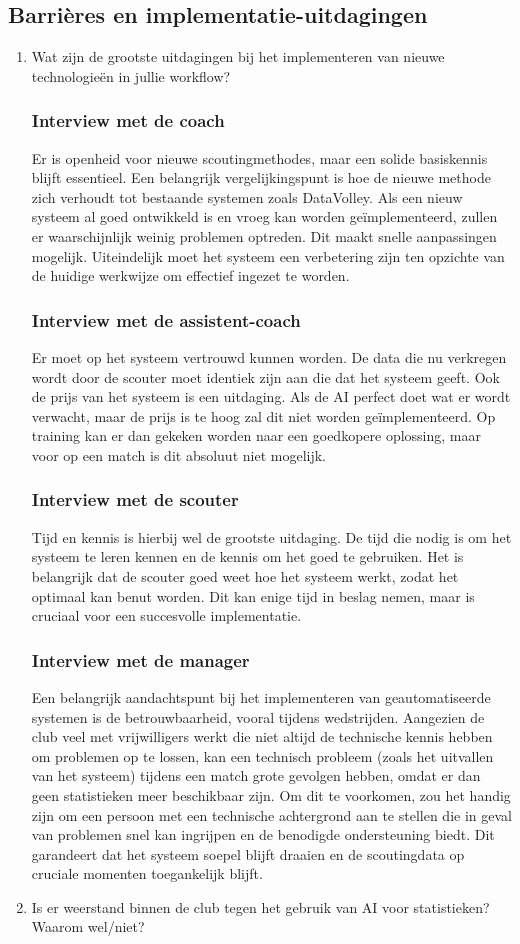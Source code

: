 \subsection{Barrières en implementatie-uitdagingen}
\begin{enumerate}
  \item Wat zijn de grootste uitdagingen bij het implementeren van nieuwe technologieën in jullie workflow?
  \subsubsection{Interview met de coach}
  Er is openheid voor nieuwe scoutingmethodes, maar een solide basiskennis blijft essentieel. Een belangrijk vergelijkingspunt is hoe de nieuwe methode zich verhoudt tot bestaande systemen zoals DataVolley. Als een nieuw systeem al goed ontwikkeld is en vroeg kan worden geïmplementeerd, zullen er waarschijnlijk weinig problemen optreden. Dit maakt snelle aanpassingen mogelijk. Uiteindelijk moet het systeem een verbetering zijn ten opzichte van de huidige werkwijze om effectief ingezet te worden.
  \subsubsection{Interview met de assistent-coach}
  Er moet op het systeem vertrouwd kunnen worden. De data die nu verkregen wordt door de scouter moet identiek zijn aan die dat het systeem geeft. Ook de prijs van het systeem is een uitdaging. Als de AI perfect doet wat er wordt verwacht, maar de prijs is te hoog zal dit niet worden geïmplementeerd. Op training kan er dan gekeken worden naar een goedkopere oplossing, maar voor op een match is dit absoluut niet mogelijk.
  \subsubsection{Interview met de scouter}
  Tijd en kennis is hierbij wel de grootste uitdaging. De tijd die nodig is om het systeem te leren kennen en de kennis om het goed te gebruiken. Het is belangrijk dat de scouter goed weet hoe het systeem werkt, zodat het optimaal kan benut worden. Dit kan enige tijd in beslag nemen, maar is cruciaal voor een succesvolle implementatie.
  \subsubsection{Interview met de manager}
  Een belangrijk aandachtspunt bij het implementeren van geautomatiseerde systemen is de betrouwbaarheid, vooral tijdens wedstrijden. Aangezien de club veel met vrijwilligers werkt die niet altijd de technische kennis hebben om problemen op te lossen, kan een technisch probleem (zoals het uitvallen van het systeem) tijdens een match grote gevolgen hebben, omdat er dan geen statistieken meer beschikbaar zijn. Om dit te voorkomen, zou het handig zijn om een persoon met een technische achtergrond aan te stellen die in geval van problemen snel kan ingrijpen en de benodigde ondersteuning biedt. Dit garandeert dat het systeem soepel blijft draaien en de scoutingdata op cruciale momenten toegankelijk blijft.
  \item Is er weerstand binnen de club tegen het gebruik van AI voor statistieken? Waarom wel/niet?

\end{enumerate}
